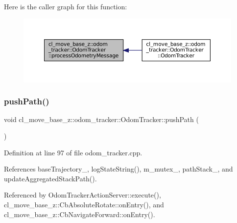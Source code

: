 Here is the caller graph for this function\+:
\nopagebreak
\begin{figure}[H]
\begin{center}
\leavevmode
\includegraphics[width=350pt]{classcl__move__base__z_1_1odom__tracker_1_1OdomTracker_a12c5a839cfde2e8f2f55a5e0c9647b18_icgraph}
\end{center}
\end{figure}
\mbox{\label{classcl__move__base__z_1_1odom__tracker_1_1OdomTracker_a205ee48ec8b4599658e7408fc4755239}} 
\subsubsection{\texorpdfstring{push\+Path()}{pushPath()}}
{\footnotesize\ttfamily void cl\+\_\+move\+\_\+base\+\_\+z\+::odom\+\_\+tracker\+::\+Odom\+Tracker\+::push\+Path (\begin{DoxyParamCaption}{ }\end{DoxyParamCaption})}



Definition at line 97 of file odom\+\_\+tracker.\+cpp.



References base\+Trajectory\+\_\+, log\+State\+String(), m\+\_\+mutex\+\_\+, path\+Stack\+\_\+, and update\+Aggregated\+Stack\+Path().



Referenced by Odom\+Tracker\+Action\+Server\+::execute(), cl\+\_\+move\+\_\+base\+\_\+z\+::\+Cb\+Absolute\+Rotate\+::on\+Entry(), and cl\+\_\+move\+\_\+base\+\_\+z\+::\+Cb\+Navigate\+Forward\+::on\+Entry().


